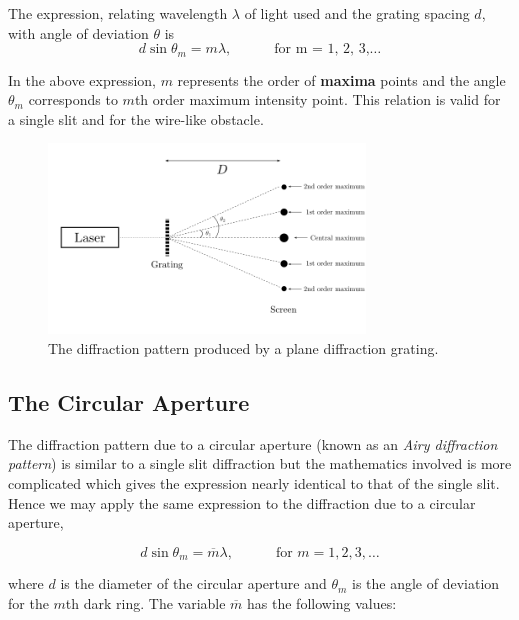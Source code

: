 \begin{refsection}
The expression, relating wavelength $\lambda$ of light used and the grating spacing $d$, with angle of deviation $\theta$ is
\begin{equation*}
    d \sin{\theta_m} = m \lambda,  \quad\quad\quad \text{for    m  = 1, 2, 3,}\hdots
\end{equation*}

In the above expression, $m$ represents the order of \textbf{maxima} points and the angle $\theta_m$  corresponds to  $m$th  order maximum intensity point. This relation is valid for a single slit and for the wire-like obstacle.

\begin{figure}[!htb]
    \centering
    \includegraphics[width=0.75\textwidth]{figs/grating.png}
    \caption{The diffraction pattern produced by a plane diffraction grating.}
    \label{fig:grating}
\end{figure}


\subsection*{The Circular Aperture}

The diffraction pattern due to a circular aperture (known as an \textit{Airy diffraction pattern}) is similar to a single slit diffraction but the mathematics involved is more complicated which gives the expression nearly identical to that of the single slit. Hence we may apply the same expression to the diffraction due to a circular aperture, 

\begin{equation*}
    d \sin{\theta_m} = \overline{m} \lambda,  \quad\quad\quad \text{for    }m  = 1, 2, 3,\hdots
\end{equation*}

where $d$ is the diameter of the circular aperture and $\theta_m$ is the angle of deviation for the $m$th dark ring. The variable $\overline{m}$ has the following values:


\end{refsection}
